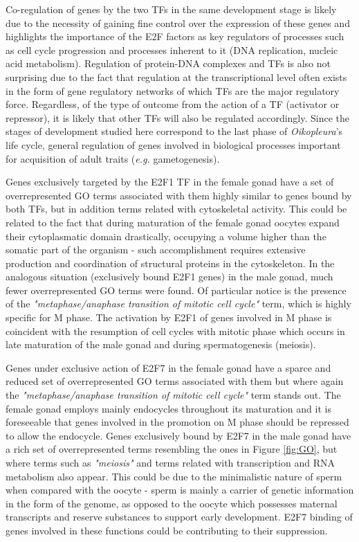\documentclass[11pt,twoside,a4paper]{report}
\begin{document}
		Co-regulation of genes by the two TFs in the same development stage is likely due to the necessity of gaining fine control over the expression of these genes and highlights the importance of the E2F factors as key regulators of processes such as cell cycle progression and processes inherent to it (DNA replication, nucleic acid metabolism). Regulation of protein-DNA complexes and TFs is also not surprising due to the fact that regulation at the transcriptional level often exists in the form of gene regulatory networks of which TFs are the major regulatory force. Regardless, of the type of outcome from the action of a TF (activator or repressor), it is likely that other TFs will also be regulated accordingly. Since the stages of development studied here correspond to the last phase of \textit{Oikopleura}'s life cycle, general regulation of genes involved in biological processes important for acquisition of adult traits (\textit{e.g.} gametogenesis).
		
		Genes exclusively targeted by the E2F1 TF in the female gonad have a set of overrepresented GO terms associated with them highly similar to genes bound by both TFs, but in addition terms related with cytoskeletal activity. This could be related to the fact that during maturation of the female gonad oocytes expand their cytoplasmatic domain drastically, occupying a volume higher than the somatic part of the organism - such accomplishment requires extensive production and coordination of structural proteins in the cytoskeleton. In the analogous situation (exclusively bound E2F1 genes) in the male gonad, much fewer overrepresented GO terms were found. Of particular notice is the presence of the \textit{"metaphase/anaphase transition of mitotic cell cycle"} term, which is highly specific for M phase. The activation by E2F1 of genes involved in M phase is coincident with the resumption of cell cycles with mitotic phase which occurs in late maturation of the male gonad and during spermatogenesis (meiosis).
		
		Genes under exclusive action of E2F7 in the female gonad have a sparce and reduced set of overrepresented GO terms associated with them but where again the \textit{"metaphase/anaphase transition of mitotic cell cycle"} term stands out. The female gonad employs mainly endocycles throughout its maturation and it is foreseeable that genes involved in the promotion on M phase should be repressed to allow the endocycle. Genes exclusively bound by E2F7 in the male gonad have a rich set of overrepresented terms resembling the ones in Figure \ref{fig:GO}, but where terms such as \textit{"meiosis"} and terms related with transcription and RNA metabolism also appear. This could be due to the minimalistic nature of sperm when compared with the oocyte - sperm is mainly a carrier of genetic information in the form of the genome, as opposed to the oocyte which possesses maternal transcripts and reserve substances to support early development. E2F7 binding of genes involved in these functions could be contributing to their suppression.
		
\end{document}
